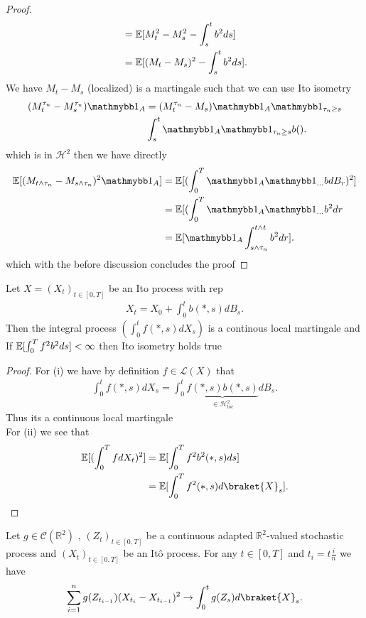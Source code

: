 \begin{proof}
\begin{align*}
  &=\mathbb{E}[M_t^2-M_s^2 - \int_s^{t} b^2 ds ] \\
  &= \mathbb{E}[(M_t-M_s)^2 - \int_s^{t} b^2 ds]
.\end{align*}
We have $M_t - M_s$ (localized) is a martingale such that we can use Ito isometry 
\begin{align*}
  (M_t^{\tau_n} - M_s^{\tau_n})\cha_A &=  (M_t^{\tau_n} - M_s)\cha_A \cha_{\tau_n \ge s} \\
                                      &\int_s^{t} \cha_A\cha_{\tau_n\ge s}b()
.\end{align*}
which is in $\mathcal{H}^2$ then we have directly 
\begin{align*}
  \E[(M_{t\land \tau_n}-M_{s \land \tau_n})^2 \cha_A] &= \E[(\int_0^{T} \cha_A\cha_{\ldots } b dB_r)^2]\\
                                                      &=  \E[(\int_0^{T} \cha_A\cha_{\ldots } b^2 dr\\
                                                      &= \E[\cha_A \int_{s\land \tau_n}^{t \land t }b^2 dr ]
.\end{align*}
which with the before discussion concludes the proof
\end{proof}
\begin{Lemma}[4.5]
  Let $X = (X_t)_{t \in [0,T]}$  be an Ito process with rep 
  \begin{align*}
    X_t = X_0 + \int_0^{t} b(*,s) dB_s
  .\end{align*}
  Then the integral process $(\int_0^{t} f(*,s) dX_s )$ is a continous local martingale  and 
  If $\mathbb{E}[\int_0^{T} f^2 b^2 ds] <\infty$ then Ito isometry holds true
\end{Lemma}
\begin{proof}
 For (i)  we have by definition $f \in \mathcal{L}(X)$ that 
 \begin{align*}
   \int_0^{t} f(*,s)dX_s = \int_0^{t} \underbrace{f(*,s)b(*,s)}_{\in  \mathcal{H}^2_{\text{loc}}}dB_s   
 .\end{align*}
 Thus its  a continuous local martingale\\
 For (ii) we see that
 \begin{align*}
   \E[(\int_0^{T} f dX_t)^2 ] &= \E[\int_0^{T} f^2b^2(*,s)ds ]\\
                              &= \E[\int_0^{T} f^2(*,s) d\braket{X}_s]
 .\end{align*}
\end{proof}
\begin{Lemma}[4.7.]
  Let $g \in  \mathcal{C}(\mathbb{R}^{2} ) $  , $(Z_t)_{t \in  [0,T]}$ be a continuous adapted $\mathbb{R}^{2} $-valued stochastic process
  and $(X_t)_{t \in  [0,T]}$ be an It\^o process. For any $t \in  [0,T]$ and $t_i = t \frac{i}{n}$ we have 
  \begin{align*}
    \sum_{i=1}^{n} g(Z_{t_{i-1}})(X_{t_i}-X_{t_{i-1}})^2 \to \int_0^{t} g(Z_s)d\braket{X}_s 
  .\end{align*}
\end{Lemma}
